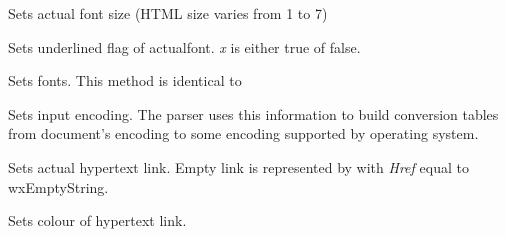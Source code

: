 \label{wxhtmlwinparsersetfontsize}


Sets actual font size (HTML size varies from 1 to 7)

\label{wxhtmlwinparsersetfontunderlined}


Sets underlined flag of actualfont. {\it x} is either true of false.

\label{wxhtmlwinparsersetfonts}


Sets fonts. This method is identical to 

\label{wxhtmlwinparsersetinputencoding}


Sets input encoding. The parser uses this information to build conversion
tables from document's encoding to some encoding supported by operating
system.

\label{wxhtmlwinparsersetlink}


Sets actual hypertext link. Empty link is represented
by  with {\it Href} equal
to wxEmptyString.

\label{wxhtmlwinparsersetlinkcolor}


Sets colour of hypertext link.

